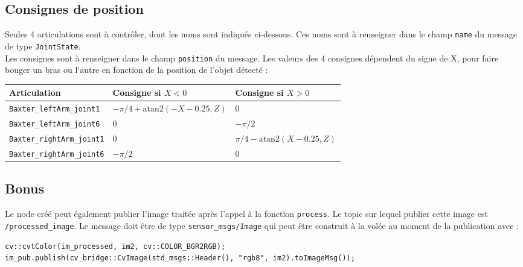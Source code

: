 \documentclass{ecnreport}
\begin{document}
\subsection{Consignes de position}

Seules 4 articulations sont à contrôler, dont les noms sont indiqués ci-dessous. 
Ces noms sont à renseigner dans le champ \texttt{name} du message de type \texttt{JointState}. \\
Les consignes sont à renseigner dans le champ \texttt{position} du message. Les valeurs des 4 consignes dépendent du signe de X, pour faire bouger un bras ou l'autre
en fonction de la position de l'objet détecté :
 \begin{center}
  \begin{tabular}{|C{6cm}|C{5cm}|C{5cm}|}\hline
   Articulation & Consigne si $X < 0$ & Consigne si $X > 0$ \\\hline
   \texttt{Baxter\_leftArm\_joint1} & $-\pi/4 + \text{atan2}(-X-0.25,Z)$& $0$\\\hline
   \texttt{Baxter\_leftArm\_joint6} & $0$& $-\pi/2$\\\hline
   \texttt{Baxter\_rightArm\_joint1} & $0$& $\pi/4 - \text{atan2}(X-0.25,Z)$\\\hline
   \texttt{Baxter\_rightArm\_joint6} & $-\pi/2$ & 0\\\hline
  \end{tabular}
 \end{center}
 


\subsection{Bonus}

Le node créé peut également publier l'image traitée après l'appel à la fonction \texttt{process}. Le topic sur lequel publier cette image est \texttt{/processed\_image}.
Le message doit être de type \texttt{sensor\_msgs/Image} qui peut être construit à la volée au moment de la publication avec :
\cppstyle
\begin{lstlisting}
cv::cvtColor(im_processed, im2, cv::COLOR_BGR2RGB);
im_pub.publish(cv_bridge::CvImage(std_msgs::Header(), "rgb8", im2).toImageMsg());
\end{lstlisting} 
\end{document}

